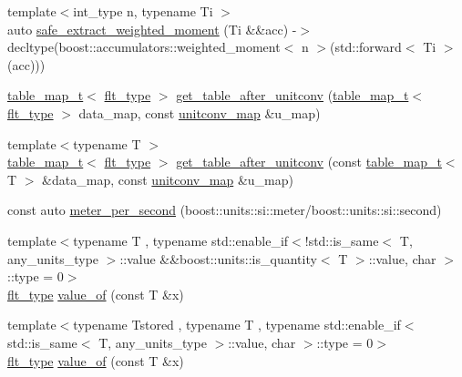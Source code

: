\begin{DoxyCompactItemize}
\item 
{\footnotesize template$<$int\+\_\+type n, typename Ti $>$ }\\auto \hyperlink{namespaceIceBRG_a2ca931a6f8819c75e4e1119fbd11ada7}{safe\+\_\+extract\+\_\+weighted\+\_\+moment} (Ti \&\&acc) -\/$>$ decltype(boost\+::accumulators\+::weighted\+\_\+moment$<$ n $>$(std\+::forward$<$ Ti $>$(acc)))
\item 
\hyperlink{namespaceIceBRG_a30d3b56b57feeb81f66815ff1bfaec6c}{table\+\_\+map\+\_\+t}$<$ \hyperlink{lib_2IceBRG__main_2common_8h_ad0f130a56eeb944d9ef2692ee881ecc4}{flt\+\_\+type} $>$ \hyperlink{namespaceIceBRG_a2b542305d65147d0b94242382ac56de8}{get\+\_\+table\+\_\+after\+\_\+unitconv} (\hyperlink{namespaceIceBRG_a30d3b56b57feeb81f66815ff1bfaec6c}{table\+\_\+map\+\_\+t}$<$ \hyperlink{lib_2IceBRG__main_2common_8h_ad0f130a56eeb944d9ef2692ee881ecc4}{flt\+\_\+type} $>$ data\+\_\+map, const \hyperlink{namespaceIceBRG_a7dff9bcf80d56e9e3fc9d9e25c89ae68}{unitconv\+\_\+map} \&u\+\_\+map)
\item 
{\footnotesize template$<$typename T $>$ }\\\hyperlink{namespaceIceBRG_a30d3b56b57feeb81f66815ff1bfaec6c}{table\+\_\+map\+\_\+t}$<$ \hyperlink{lib_2IceBRG__main_2common_8h_ad0f130a56eeb944d9ef2692ee881ecc4}{flt\+\_\+type} $>$ \hyperlink{namespaceIceBRG_aca898700c1a50aa7fb8481673c56ae98}{get\+\_\+table\+\_\+after\+\_\+unitconv} (const \hyperlink{namespaceIceBRG_a30d3b56b57feeb81f66815ff1bfaec6c}{table\+\_\+map\+\_\+t}$<$ T $>$ \&data\+\_\+map, const \hyperlink{namespaceIceBRG_a7dff9bcf80d56e9e3fc9d9e25c89ae68}{unitconv\+\_\+map} \&u\+\_\+map)
\item 
const auto \hyperlink{namespaceIceBRG_a08cdd3f6d83518620b066a3e6c65701d}{meter\+\_\+per\+\_\+second} (boost\+::units\+::si\+::meter/boost\+::units\+::si\+::second)
\item 
{\footnotesize template$<$typename T , typename std\+::enable\+\_\+if$<$!std\+::is\+\_\+same$<$ T, any\+\_\+units\+\_\+type $>$\+::value \&\&boost\+::units\+::is\+\_\+quantity$<$ T $>$\+::value, char $>$\+::type  = 0$>$ }\\\hyperlink{lib_2IceBRG__main_2common_8h_ad0f130a56eeb944d9ef2692ee881ecc4}{flt\+\_\+type} \hyperlink{namespaceIceBRG_a381f2d74ab3585a8e238dbf1d2074a30}{value\+\_\+of} (const T \&x)
\item 
{\footnotesize template$<$typename Tstored , typename T , typename std\+::enable\+\_\+if$<$ std\+::is\+\_\+same$<$ T, any\+\_\+units\+\_\+type $>$\+::value, char $>$\+::type  = 0$>$ }\\\hyperlink{lib_2IceBRG__main_2common_8h_ad0f130a56eeb944d9ef2692ee881ecc4}{flt\+\_\+type} \hyperlink{namespaceIceBRG_ad3ed8ee7dcfd906dbb8eaae25e817cbe}{value\+\_\+of} (const T \&x)

\end{DoxyCompactItemize}

